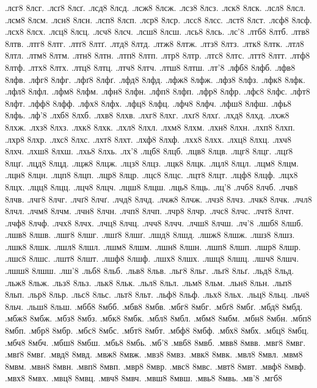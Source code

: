 {.лсг8
8лсг.
.лсґ8
8лсґ.
.лсд8
8лсд.
.лсж8
8лсж.
.лсз8
8лсз.
.лск8
8лск.
.лсл8
8лсл.
.лсм8
8лсм.
.лсн8
8лсн.
.лсп8
8лсп.
.лср8
8лср.
.лсс8
8лсс.
.лст8
8лст.
.лсф8
8лсф.
.лсх8
8лсх.
.лсц8
8лсц.
.лсч8
8лсч.
.лсш8
8лсш.
.лсь8
8лсь.
.лс'8
.лтб8
8лтб.
.лтв8
8лтв.
.лтг8
8лтг.
.лтґ8
8лтґ.
.лтд8
8лтд.
.лтж8
8лтж.
.лтз8
8лтз.
.лтк8
8лтк.
.лтл8
8лтл.
.лтм8
8лтм.
.лтн8
8лтн.
.лтп8
8лтп.
.лтр8
8лтр.
.лтс8
8лтс.
.лтт8
8лтт.
.лтф8
8лтф.
.лтх8
8лтх.
.лтц8
8лтц.
.лтч8
8лтч.
.лтш8
8лтш.
.лт'8
.лфб8
8лфб.
.лфв8
8лфв.
.лфг8
8лфг.
.лфґ8
8лфґ.
.лфд8
8лфд.
.лфж8
8лфж.
.лфз8
8лфз.
.лфк8
8лфк.
.лфл8
8лфл.
.лфм8
8лфм.
.лфн8
8лфн.
.лфп8
8лфп.
.лфр8
8лфр.
.лфс8
8лфс.
.лфт8
8лфт.
.лфф8
8лфф.
.лфх8
8лфх.
.лфц8
8лфц.
.лфч8
8лфч.
.лфш8
8лфш.
.лфь8
8лфь.
.лф'8
.лхб8
8лхб.
.лхв8
8лхв.
.лхг8
8лхг.
.лхґ8
8лхґ.
.лхд8
8лхд.
.лхж8
8лхж.
.лхз8
8лхз.
.лхк8
8лхк.
.лхл8
8лхл.
.лхм8
8лхм.
.лхн8
8лхн.
.лхп8
8лхп.
.лхр8
8лхр.
.лхс8
8лхс.
.лхт8
8лхт.
.лхф8
8лхф.
.лхх8
8лхх.
.лхц8
8лхц.
.лхч8
8лхч.
.лхш8
8лхш.
.лхь8
8лхь.
.лх'8
.лцб8
8лцб.
.лцв8
8лцв.
.лцг8
8лцг.
.лцґ8
8лцґ.
.лцд8
8лцд.
.лцж8
8лцж.
.лцз8
8лцз.
.лцк8
8лцк.
.лцл8
8лцл.
.лцм8
8лцм.
.лцн8
8лцн.
.лцп8
8лцп.
.лцр8
8лцр.
.лцс8
8лцс.
.лцт8
8лцт.
.лцф8
8лцф.
.лцх8
8лцх.
.лцц8
8лцц.
.лцч8
8лцч.
.лцш8
8лцш.
.лць8
8лць.
.лц'8
.лчб8
8лчб.
.лчв8
8лчв.
.лчг8
8лчг.
.лчґ8
8лчґ.
.лчд8
8лчд.
.лчж8
8лчж.
.лчз8
8лчз.
.лчк8
8лчк.
.лчл8
8лчл.
.лчм8
8лчм.
.лчн8
8лчн.
.лчп8
8лчп.
.лчр8
8лчр.
.лчс8
8лчс.
.лчт8
8лчт.
.лчф8
8лчф.
.лчх8
8лчх.
.лчц8
8лчц.
.лчч8
8лчч.
.лчш8
8лчш.
.лч'8
.лшб8
8лшб.
.лшв8
8лшв.
.лшг8
8лшг.
.лшґ8
8лшґ.
.лшд8
8лшд.
.лшж8
8лшж.
.лшз8
8лшз.
.лшк8
8лшк.
.лшл8
8лшл.
.лшм8
8лшм.
.лшн8
8лшн.
.лшп8
8лшп.
.лшр8
8лшр.
.лшс8
8лшс.
.лшт8
8лшт.
.лшф8
8лшф.
.лшх8
8лшх.
.лшц8
8лшц.
.лшч8
8лшч.
.лшш8
8лшш.
.лш'8
.льб8
8льб.
.льв8
8льв.
.льг8
8льг.
.льґ8
8льґ.
.льд8
8льд.
.льж8
8льж.
.льз8
8льз.
.льк8
8льк.
.льл8
8льл.
.льм8
8льм.
.льн8
8льн.
.льп8
8льп.
.льр8
8льр.
.льс8
8льс.
.льт8
8льт.
.льф8
8льф.
.льх8
8льх.
.льц8
8льц.
.льч8
8льч.
.льш8
8льш.
.мбб8
8мбб.
.мбв8
8мбв.
.мбг8
8мбг.
.мбґ8
8мбґ.
.мбд8
8мбд.
.мбж8
8мбж.
.мбз8
8мбз.
.мбк8
8мбк.
.мбл8
8мбл.
.мбм8
8мбм.
.мбн8
8мбн.
.мбп8
8мбп.
.мбр8
8мбр.
.мбс8
8мбс.
.мбт8
8мбт.
.мбф8
8мбф.
.мбх8
8мбх.
.мбц8
8мбц.
.мбч8
8мбч.
.мбш8
8мбш.
.мбь8
8мбь.
.мб'8
.мвб8
8мвб.
.мвв8
8мвв.
.мвг8
8мвг.
.мвґ8
8мвґ.
.мвд8
8мвд.
.мвж8
8мвж.
.мвз8
8мвз.
.мвк8
8мвк.
.мвл8
8мвл.
.мвм8
8мвм.
.мвн8
8мвн.
.мвп8
8мвп.
.мвр8
8мвр.
.мвс8
8мвс.
.мвт8
8мвт.
.мвф8
8мвф.
.мвх8
8мвх.
.мвц8
8мвц.
.мвч8
8мвч.
.мвш8
8мвш.
.мвь8
8мвь.
.мв'8
.мгб8
}
